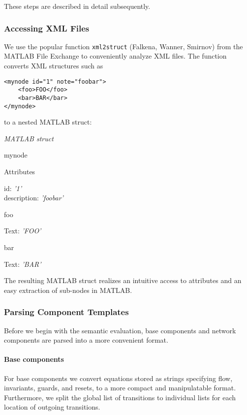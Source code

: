 These steps are described in detail subsequently.

\subsubsection{Accessing XML Files} \label{sec:accessingXMLFiles}

We use the popular function \texttt{xml2struct} (Falkena, Wanner, Smirnov) from the MATLAB File Exchange to conveniently analyze XML files.
The function converts XML structures such as 
\begin{lstlisting}
<mynode id="1" note="foobar">
	<foo>FOO</foo>
	<bar>BAR</bar>
</mynode> 
\end{lstlisting}
to a nested MATLAB struct:
\begin{nestedlist}
  \textit{MATLAB struct}
  \begin{nestedlist}
    mynode
    \begin{nestedlist}
      Attributes
      \begin{nestedlist}
        id: \textit{'1'}\\
        description: \textit{'foobar'}
      \end{nestedlist}
      foo
      \begin{nestedlist}
        Text: \textit{'FOO'}
      \end{nestedlist}
      bar
      \begin{nestedlist}
        Text: \textit{'BAR'}
      \end{nestedlist}
    \end{nestedlist}
  \end{nestedlist}
\end{nestedlist}
The resulting MATLAB struct realizes an intuitive access to attributes and an easy extraction of sub-nodes in MATLAB. %

\subsubsection{Parsing Component Templates} \label{sec:parsingComponentDefinitions}

Before we begin with the semantic evaluation, base components and network components are parsed into a more convenient format.

\paragraph{Base components} For base components we convert equations stored as strings specifying flow, invariants, guards, and resets, to a more compact and manipulatable format. Furthermore, we split the global list of transitions to individual lists for each location of outgoing transitions.

